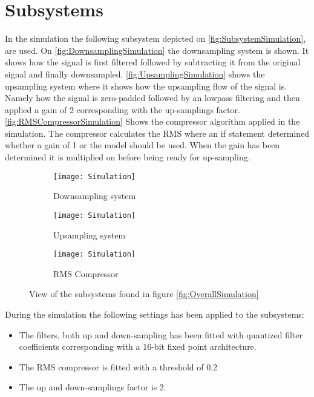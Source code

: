 \section{Subsystems}
In the simulation the following subsystem depicted on \autoref{fig:SubsystemSimulation}, are used. On \autoref{fig:DownsamplingSimulation} the downsampling system is shown. It shows how the signal is first filtered followed by subtracting it from the original signal and finally downsampled. \autoref{fig:UpsamplingSimulation} shows the upsampling system where it shows how the upsampling flow of the signal is. Namely how the signal is zero-padded followed by an lowpass filtering and then applied a gain of 2 corresponding with the up-samplings factor. \autoref{fig:RMSCompressorSimulation} Shows the compressor algorithm applied in the simulation. The compressor calculates the RMS where an if statement determined whether a gain of 1 or the model should be used. When the gain has been determined it is multiplied on before being ready for up-sampling. 
\begin{figure}[H]
\centering
\begin{subfigure}[t]{0.49\textwidth}
    \centering
\texttt{[image: Simulation]}
    \caption{Downsampling system}
    \label{fig:DownsamplingSimulation}
\end{subfigure}
\begin{subfigure}[t]{0.49\textwidth}
    \centering
\texttt{[image: Simulation]}
    \caption{Upsampling system}
    \label{fig:UpsamplingSimulation}
\end{subfigure}
\begin{subfigure}[t]{\textwidth}
    \centering
\texttt{[image: Simulation]}
    \caption{RMS Compressor}
    \label{fig:RMSCompressorSimulation}
\end{subfigure}
\label{fig:SubsystemSimulation}
\caption{View of the subsystems found in figure \ref{fig:OverallSimulation}}
\end{figure}


During the simulation the following settings has been applied to the subsystems:
\begin{itemize}
\item The filters, both up and down-sampling has been fitted with quantized filter coefficients corresponding with a 16-bit fixed point architecture.
\item The RMS compressor is fitted with a threshold of 0.2 
\item The up and down-samplings factor is 2.
\end{itemize}

